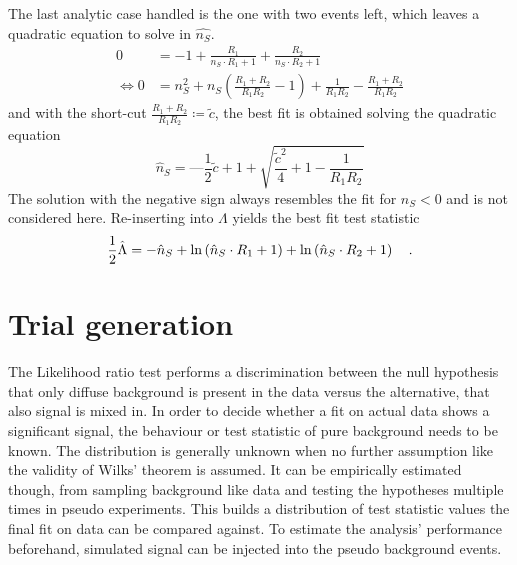 The last analytic case handled is the one with two events left, which leaves a quadratic equation to solve in $\hat{n_S}$.
\begin{align}
  0 &= -1 + \frac{R_1}{n_S\cdot R_1 + 1} + \frac{R_2}{n_S\cdot R_2 + 1} \\
  \Leftrightarrow
  0 &= n_S^2 + n_S \left(\frac{R_1 + R_2}{R_1 R_2} - 1\right) +
       \frac{1}{R_1 R_2} - \frac{R_1 + R_2}{R_1 R_2}
\end{align}
and with the short-cut $\frac{R_1 + R_2}{R_1 R_2} \coloneq\tilde{c}$, the best fit is obtained solving the quadratic equation
\begin{equation}
  \hat{n}_S = —\frac{1}{2}\tilde{c} + 1 + \sqrt{\frac{\tilde{c}^2}{4} + 1 - \frac{1}{R_1 R_2}}
\end{equation}
The solution with the negative sign always resembles the fit for $n_S < 0$ and is not considered here.
Re-inserting into $\Lambda$ yields the best fit test statistic
\begin{equation}
  \frac{1}{2}\hat{\Lambda} = -\hat{n}_S +
                             \ln\left( \hat{n}_S \cdot R_1 + 1 \right) +
                             \ln\left( \hat{n}_S \cdot R_2 + 1 \right)
  \quad\text{.}
\end{equation}


\section{Trial generation}
The Likelihood ratio test performs a discrimination between the null hypothesis that only diffuse background is present in the data versus the alternative, that also signal is mixed in.
In order to decide whether a fit on actual data shows a significant signal, the behaviour or test statistic of pure background needs to be known.
The distribution is generally unknown when no further assumption like the validity of Wilks' theorem is assumed.
It can be empirically estimated though, from sampling background like data and testing the hypotheses multiple times in pseudo experiments.
This builds a distribution of test statistic values the final fit on data can be compared against.
To estimate the analysis' performance beforehand, simulated signal can be injected into the pseudo background events.

